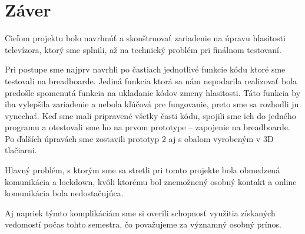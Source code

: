 \chapter{Záver}

Cieľom projektu bolo navrhnúť a skonštruovať zariadenie na úpravu hlasitosti televízora, ktorý sme splnili, až na technický problém pri finálnom testovaní.

Pri postupe sme najprv navrhli po častiach jednotlivé funkcie kódu ktoré sme testovali na breadboarde. Jediná funkcia ktorá sa nám nepodarila realizovať bola predošle spomenutá funkcia na ukladanie kódov zmeny hlasitosti. Táto funkcia by iba vylepšila zariadenie a nebola kľúčová pre fungovanie, preto sme sa rozhodli ju vynechať. Keď sme mali pripravené všetky časti kódu, spojili sme ich do jedného programu a otestovali sme ho na prvom prototype – zapojenie na breadboarde. Po ďalších úpravách sme zostavili prototyp 2 aj s obalom vyrobeným v 3D tlačiarni.

Hlavný problém, s ktorým sme sa stretli pri tomto projekte bola obmedzená komunikácia a lockdown, kvôli ktorému bol znemožnený osobný kontakt a online komunikácia bola nedostačujúca.

Aj napriek týmto komplikáciám sme si overili schopnosť využitia získaných vedomostí počas tohto semestra, čo považujeme za významný osobný prínos.


